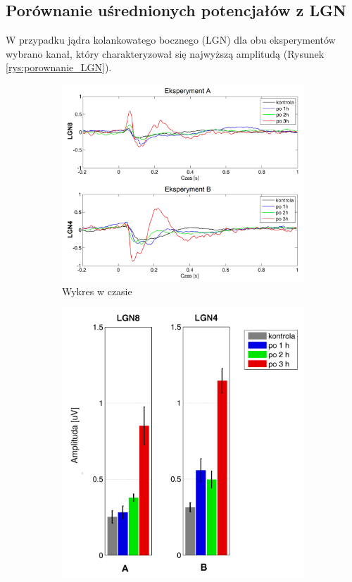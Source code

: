 \documentclass{pracamgr_2}
\begin{document}
\subsection{Porównanie uśrednionych potencjałów z LGN}
W przypadku jądra kolankowatego bocznego (LGN) dla obu eksperymentów wybrano kanał, który charakteryzował się najwyższą amplitudą (Rysunek \ref{rys:porownanie_LGN}).
\begin{figure}[h]
	\begin{subfigure}{.57\textwidth}
		\centering
		\includegraphics[width=1.\linewidth]{porow_LGN.png}
		\caption{Wykres w czasie}
		\label{rys:porow_LGN}
	\end{subfigure}%
	\begin{subfigure}{.43\textwidth}
		\centering
		\includegraphics[width=1.\linewidth]{porow_stat_LGN.png}

\end{subfigure}
\end{figure}
\end{document}
